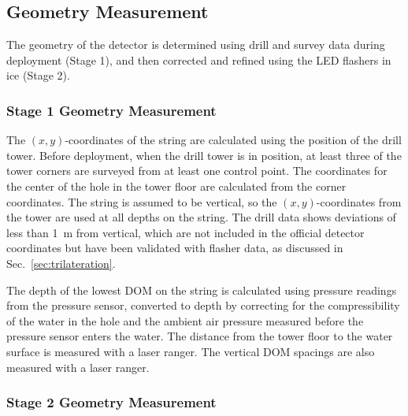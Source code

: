 \subsection{Geometry Measurement}

The geometry of the detector is determined using drill and survey data
during deployment (Stage 1), and then corrected and refined using the LED
flashers in ice (Stage 2).

\subsubsection{Stage 1 Geometry Measurement}
The $(x,y)$-coordinates of the string are calculated using the position of
the drill tower. Before deployment, when the drill tower is in position, at
least three of the tower corners are surveyed from at least one control
point.  The coordinates for the center of the hole in the tower floor are
calculated from the corner coordinates. The string is assumed to be
vertical, so the $(x,y)$-coordinates from the tower are used at all
depths on the string. The drill
data shows deviations of less than 1~m from vertical, which are not
included in the official detector coordinates but have been validated
with flasher data, as discussed in Sec.~\ref{sec:trilateration}. 

The depth of the lowest DOM on the string is calculated using pressure
readings from the pressure sensor, converted to depth by correcting for the
compressibility of the water in the hole and the ambient air pressure
measured before the pressure sensor enters the water. The distance from the
tower floor to the water surface is measured with a laser ranger. The
vertical DOM spacings are also measured with a laser
ranger. 

\subsubsection{Stage 2 Geometry Measurement}


